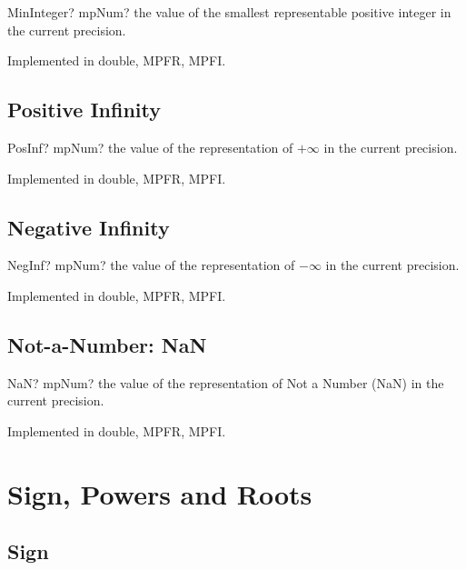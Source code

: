 \begin{mpFunctionsExtract}
	\mpFunctionZero
	{MinInteger? mpNum? the value of the smallest representable positive integer in the current precision.}
\end{mpFunctionsExtract}

Implemented in double, MPFR, MPFI.


\subsection{Positive Infinity}

\begin{mpFunctionsExtract}
	\mpFunctionZero
	{PosInf? mpNum? the value of the representation of  $+\infty$ in the current precision.}
\end{mpFunctionsExtract}

Implemented in double, MPFR, MPFI.



\subsection{Negative Infinity}

\begin{mpFunctionsExtract}
	\mpFunctionZero
	{NegInf? mpNum? the value of the representation of  $-\infty$ in the current precision.}
\end{mpFunctionsExtract}


Implemented in double, MPFR, MPFI.



\subsection{Not-a-Number: NaN}

\begin{mpFunctionsExtract}
	\mpFunctionZero
	{NaN? mpNum? the value of the representation of Not a Number (NaN) in the current precision.}
\end{mpFunctionsExtract}

Implemented in double, MPFR, MPFI.





\section{Sign, Powers and Roots}
\label{Roots}


\subsection{Sign}

